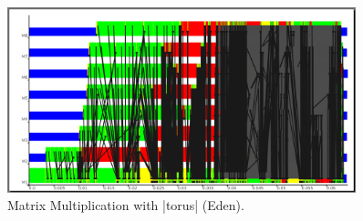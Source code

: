\begin{figure}[tb]
	\centering
	\includegraphics[width=0.9\textwidth]{images/torus_matrix_eden_scale}
	\caption[Matrix Multiplication with |torus| (Eden)]{Matrix Multiplication with |torus| (Eden).}
	\label{fig:torus_eden_trace}
\end{figure}


